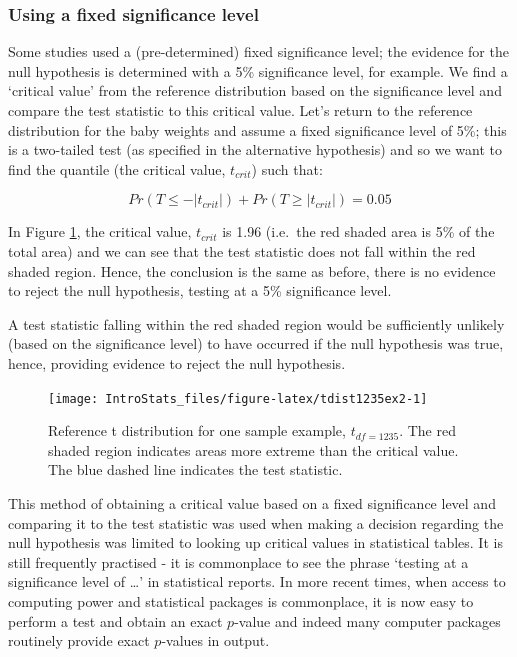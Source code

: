 \documentclass[
  oneside]{krantz}
\begin{document}
\hypertarget{using-a-fixed-significance-level}{%
\subsubsection{Using a fixed significance level}\label{using-a-fixed-significance-level}}

Some studies used a (pre-determined) fixed significance level; the evidence for the null hypothesis is determined with a 5\% significance level, for example. We find a `critical value' from the reference distribution based on the significance level and compare the test statistic to this critical value. Let's return to the reference distribution for the baby weights and assume a fixed significance level of 5\%; this is a two-tailed test (as specified in the alternative hypothesis) and so we want to find the quantile (the critical value, \(t_{crit}\)) such that:

\[Pr(T \le -|t_{crit}|) + Pr(T \ge |t_{crit}|) = 0.05\]

In Figure \ref{fig:tdist1235ex2}, the critical value, \(t_{crit}\) is 1.96 (i.e.~the red shaded area is 5\% of the total area) and we can see that the test statistic does not fall within the red shaded region. Hence, the conclusion is the same as before, there is no evidence to reject the null hypothesis, testing at a 5\% significance level.

A test statistic falling within the red shaded region would be sufficiently unlikely (based on the significance level) to have occurred if the null hypothesis was true, hence, providing evidence to reject the null hypothesis.

\begin{figure}[!htb]

{\centering \texttt{[image: IntroStats\_files/figure-latex/tdist1235ex2-1]} 

}

\caption{Reference t distribution for one sample example, $t_{df=1235}$. The red shaded region indicates areas more extreme than the critical value. The blue dashed line indicates the test statistic.}\label{fig:tdist1235ex2}
\end{figure}

This method of obtaining a critical value based on a fixed significance level and comparing it to the test statistic was used when making a decision regarding the null hypothesis was limited to looking up critical values in statistical tables. It is still frequently practised - it is commonplace to see the phrase `testing at a significance level of \ldots{}' in statistical reports. In more recent times, when access to computing power and statistical packages is commonplace, it is now easy to perform a test and obtain an exact \(p\)-value and indeed many computer packages routinely provide exact \(p\)-values in output.
\end{document}
